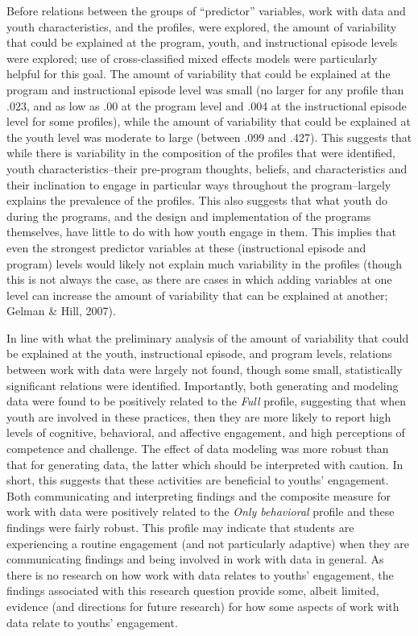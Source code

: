 \documentclass[]{msu-thesis}
\theoremstyle{definition}
\theoremstyle{definition}
\theoremstyle{definition}
\theoremstyle{remark}
\begin{document}
Before relations between the groups of ``predictor'' variables, work
with data and youth characteristics, and the profiles, were explored,
the amount of variability that could be explained at the program, youth,
and instructional episode levels were explored; use of cross-classified
mixed effects models were particularly helpful for this goal. The amount
of variability that could be explained at the program and instructional
episode level was small (no larger for any profile than .023, and as low
as .00 at the program level and .004 at the instructional episode level
for some profiles), while the amount of variability that could be
explained at the youth level was moderate to large (between .099 and
.427). This suggests that while there is variability in the composition
of the profiles that were identified, youth characteristics--their
pre-program thoughts, beliefs, and characteristics and their inclination
to engage in particular ways throughout the program--largely explains
the prevalence of the profiles. This also suggests that what youth do
during the programs, and the design and implementation of the programs
themselves, have little to do with how youth engage in them. This
implies that even the strongest predictor variables at these
(instructional episode and program) levels would likely not explain much
variability in the profiles (though this is not always the case, as
there are cases in which adding variables at one level can increase the
amount of variability that can be explained at another; Gelman \& Hill,
2007).

In line with what the preliminary analysis of the amount of variability
that could be explained at the youth, instructional episode, and program
levels, relations between work with data were largely not found, though
some small, statistically significant relations were identified.
Importantly, both generating and modeling data were found to be
positively related to the \emph{Full} profile, suggesting that when
youth are involved in these practices, then they are more likely to
report high levels of cognitive, behavioral, and affective engagement,
and high perceptions of competence and challenge. The effect of data
modeling was more robust than that for generating data, the latter which
should be interpreted with caution. In short, this suggests that these
activities are beneficial to youths' engagement. Both communicating and
interpreting findings and the composite measure for work with data were
positively related to the \emph{Only behavioral} profile and these
findings were fairly robust. This profile may indicate that students are
experiencing a routine engagement (and not particularly adaptive) when
they are communicating findings and being involved in work with data in
general. As there is no research on how work with data relates to
youths' engagement, the findings associated with this research question
provide some, albeit limited, evidence (and directions for future
research) for how some aspects of work with data relate to youths'
engagement.
\end{document}
